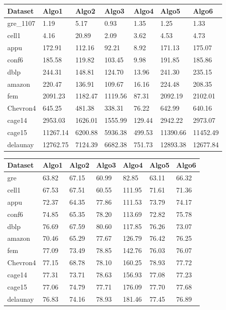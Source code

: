 \begin{center} %
    \begin{tabular}{| l | l | l | l | l | l | l |}
    \hline
	Dataset & Algo1 & Algo2 & Algo3 & Algo4 & Algo5 & Algo6\\ \hline
	gre\_1107 & 1.19 & 5.17 & 0.93 & 1.35 & 1.25 & 1.33 \\ \hline
	cell1 & 4.16 & 20.89 & 2.09 & 3.62 & 4.53 & 4.73\\ \hline
	appu & 172.91 & 112.16 & 92.21 & 8.92 & 171.13 & 175.07\\ \hline
	conf6 & 185.58 & 119.82 & 103.45 & 9.98 & 191.85 & 185.86\\ \hline
	dblp & 244.31 & 148.81 & 124.70 & 13.96 & 241.30 & 235.15\\ \hline
	amazon & 220.47 & 136.91 & 109.67 & 16.16 & 224.48 & 208.35\\ \hline
	fem & 2091.23 & 1182.47 & 1119.56 & 87.31 & 2092.19 & 2102.01\\ \hline
	Chevron4 & 645.25 & 481.38 & 338.31 & 76.22 & 642.99 & 640.16\\ \hline
	cage14 & 2953.03 & 1626.01 & 1555.99 & 129.44 & 2942.22 & 2973.07\\ \hline
	cage15 & 11267.14 & 6200.88 & 5936.38 & 499.53 & 11390.66 & 11452.49\\ \hline
	delaunay & 12762.75 & 7124.39 & 6682.38 & 751.73 & 12893.38 & 12677.84\\ \hline
    \hline
    \end{tabular}
\end{center}

\begin{center} %
    \begin{tabular}{| l | l | l | l | l | l | l |}
    \hline
	Dataset & Algo1 & Algo2 & Algo3 & Algo4 & Algo5 & Algo6\\ \hline
	gre & 63.82 & 67.15 & 60.99 & 82.85 & 63.11 & 66.32 \\ \hline
	cell1 & 67.53 & 67.51 & 60.55 & 111.95 & 71.61 & 71.36\\ \hline
	appu & 72.37 & 64.35 & 77.86 & 111.53 & 73.79 & 74.17\\ \hline
	conf6 & 74.85 & 65.35 & 78.20 & 113.69 & 72.82 & 75.78\\ \hline
	dblp & 76.69 & 67.59 & 80.60 & 117.85 & 76.26 & 73.07\\ \hline
	amazon & 70.46 & 65.29 & 77.67 & 126.79 & 76.42 & 76.25\\ \hline
	fem & 77.09 & 73.49 & 78.85 & 142.76 & 76.03 & 76.07\\ \hline
	Chevron4 & 77.15 & 68.78 & 78.10 & 160.25 & 78.93 & 77.72\\ \hline
	cage14 & 77.31 & 73.71 & 78.63 & 156.93 & 77.08 & 77.23\\ \hline
	cage15 & 77.06 & 74.79 & 77.71 & 176.09 & 77.70 & 77.68\\ \hline
	delaunay & 76.83 & 74.16 & 78.93 & 181.46 & 77.45 & 76.89\\ \hline
    \hline
    \end{tabular}
\end{center}


